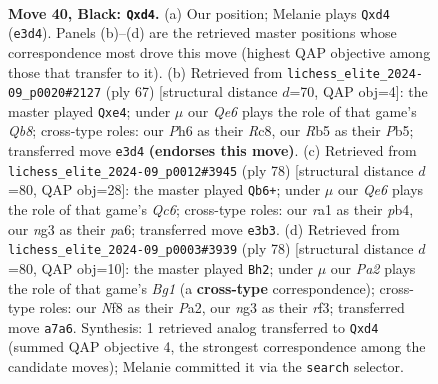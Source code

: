 \documentclass[11pt]{article}
\begin{document}
\clearpage

\begin{figure}[p]\centering
\begin{subfigure}{0.46\textwidth}\centering
\resizebox{\linewidth}{!}{%
\newchessgame
\chessboard[
  setfen={5n1k/ppQ4p/7p/1r6/3P4/4q1N1/6K1/R6R b - - 5 40},
  showmover=false,
  pgfstyle=straightmove, color=movearrow, markmove={e3-d4}
]}
\caption{}
\end{subfigure}\hfill
\begin{subfigure}{0.46\textwidth}\centering
\resizebox{\linewidth}{!}{%
\newchessgame
\chessboard[
  setfen={2r3k1/5p2/p5p1/1p2P1P1/4Q3/8/3K4/1qR2R2 b - - 0 34},
  showmover=false,
  pgfstyle=straightmove, color=movearrow, markmove={b1-e4}
]}
\caption{}
\end{subfigure}
\\[4pt]
\begin{subfigure}{0.46\textwidth}\centering
\resizebox{\linewidth}{!}{%
\newchessgame
\chessboard[
  setfen={1k6/8/p1Q4p/2P4r/1p2pP2/1P2P1KP/4q3/2R5 w - - 1 40},
  showmover=false,
  pgfstyle=straightmove, color=movearrow, markmove={c6-b6}
]}
\caption{}
\end{subfigure}\hfill
\begin{subfigure}{0.46\textwidth}\centering
\resizebox{\linewidth}{!}{%
\newchessgame
\chessboard[
  setfen={6k1/p7/3q4/2p4K/2P1PrP1/5r2/P5Q1/6B1 w - - 0 40},
  showmover=false,
  pgfstyle=straightmove, color=movearrow, markmove={g1-h2}
]}
\caption{}
\end{subfigure}
\caption{\textbf{Move 40, Black: \texttt{Qxd4}.} (a) Our position; Melanie plays \texttt{Qxd4} (\texttt{e3d4}). Panels (b)--(d) are the retrieved master positions whose correspondence most drove this move (highest QAP objective among those that transfer to it). (b) Retrieved from \texttt{lichess\_elite\_2024-09\_p0020\#2127} (ply 67) [structural distance $d$=70, QAP obj=4]: the master played \texttt{Qxe4}; under $\mu$ our \emph{Qe6} plays the role of that game's \emph{Qb8}; cross-type roles: our \emph{P}h6 as their \emph{R}c8, our \emph{R}b5 as their \emph{P}b5; transferred move \texttt{e3d4} \textbf{(endorses this move)}. (c) Retrieved from \texttt{lichess\_elite\_2024-09\_p0012\#3945} (ply 78) [structural distance $d$=80, QAP obj=28]: the master played \texttt{Qb6+}; under $\mu$ our \emph{Qe6} plays the role of that game's \emph{Qc6}; cross-type roles: our \emph{r}a1 as their \emph{p}b4, our \emph{n}g3 as their \emph{p}a6; transferred move \texttt{e3b3}. (d) Retrieved from \texttt{lichess\_elite\_2024-09\_p0003\#3939} (ply 78) [structural distance $d$=80, QAP obj=10]: the master played \texttt{Bh2}; under $\mu$ our \emph{Pa2} plays the role of that game's \emph{Bg1} (a \textbf{cross-type} correspondence); cross-type roles: our \emph{N}f8 as their \emph{P}a2, our \emph{n}g3 as their \emph{r}f3; transferred move \texttt{a7a6}. Synthesis: 1 retrieved analog transferred to \texttt{Qxd4} (summed QAP objective 4, the strongest correspondence among the candidate moves); Melanie committed it via the \texttt{search} selector.}
\label{fig:thought-m79}
\end{figure}
\end{document}
